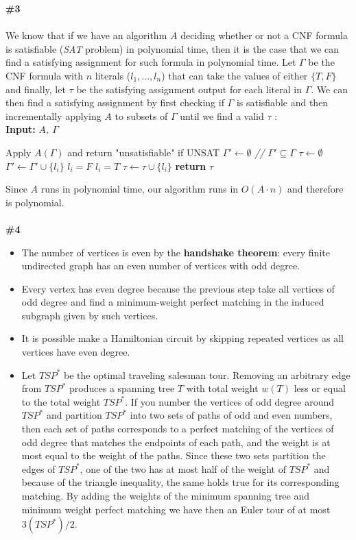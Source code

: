 \documentclass{article}
\begin{document}
\textbf{\#3}
\\
\\
We know that if we have an algorithm $A$ deciding whether or not a CNF formula is satisfiable (\textit{SAT} problem) in polynomial time, then it is the case that we can find a satisfying assignment for such formula in polynomial time. Let $\Gamma$ be the CNF formula with $n$ literals ($l_1, ..., l_n$) that can take the values of either $\{ T, F\}$ and finally, let $\tau$ be the satisfying assignment output for each literal in $\Gamma$. We can then find a satisfying assignment by first checking if $\Gamma$ is satisfiable and then incrementally applying $A$ to subsets of $\Gamma$ until we find a valid $\tau$	:
\\
\newpage
\textbf{Input:} \textit{$A$, $\Gamma$}
\begin{algorithmic}
\State Apply $A(\Gamma)$ and return "unsatisfiable" if UNSAT
\State $\Gamma' \gets \emptyset$ \textit{ // $\Gamma' \subseteq \Gamma$}
\State $\tau \gets \emptyset$
  \State $\Gamma' \gets \Gamma' \cup \{l_i\}$
  \State $l_i = F$
    \State $l_i = T$
  \EndIf
  \State $\tau \gets \tau \cup \{ l_i\}$
\EndFor
\State \textbf{return} $\tau$\\
\end{algorithmic}
Since $A$ runs in polynomial time, our algorithm runs in $O(A \cdot n)$ and therefore is polynomial.
\\
\\
\textbf{\#4}
\begin{itemize}
\item The number of vertices is even by the \textbf{handshake theorem}: every finite undirected graph has an even number of vertices with odd degree.
\item Every vertex has even degree because the previous step take all vertices of odd degree and find a minimum-weight perfect matching in the induced subgraph given by such vertices.
\item It is possible make a Hamiltonian circuit by skipping repeated vertices as all vertices have even degree.
\item Let $TSP^*$ be the optimal traveling salesman tour. Removing an arbitrary edge from $TSP^*$ produces a spanning tree $T$ with total weight $w(T)$ less or equal to the total weight $TSP^*$. If you number the vertices of odd degree around $TSP^*$ and partition $TSP^*$ into two sets of paths of odd and even numbers, then each set of paths corresponds to a perfect matching of the vertices of odd degree that matches the endpoints of each path, and the weight is at most equal to the weight of the paths. Since these two sets partition the edges of $TSP^*$, one of the two has at most half of the weight of $TSP^*$ and because of the triangle inequality, the same holds true for its corresponding matching. By adding the weights of the minimum spanning tree and minimum weight perfect matching we have then an Euler tour of at most $3(TSP^*)/2$.
\\
\end{itemize}
\end{document}
